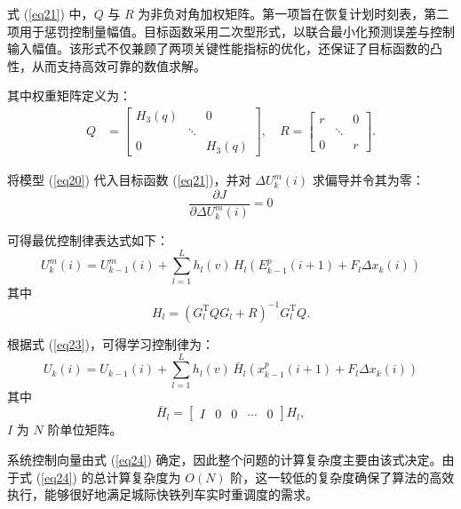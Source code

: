 式 (\ref{eq21}) 中，$Q$ 与 $R$ 为非负对角加权矩阵。第一项旨在恢复计划时刻表，第二项用于惩罚控制量幅值。目标函数采用二次型形式，以联合最小化预测误差与控制输入幅值。该形式不仅兼顾了两项关键性能指标的优化，还保证了目标函数的凸性，从而支持高效可靠的数值求解。

其中权重矩阵定义为：
\begin{equation*}
\begin{aligned}
Q &= 
\left[
\begin{array}{ccc}
H_{3}(q) &        & 0 \\
         & \ddots &   \\
0        &        & H_{3}(q)
\end{array}
\right],
\quad
R = 
\left[
\begin{array}{ccc}
r &        & 0 \\
  & \ddots &   \\
0 &        & r
\end{array}
\right].
\end{aligned}
\end{equation*}

将模型 (\ref{eq20}) 代入目标函数 (\ref{eq21})，并对 $\Delta U_k^m(i)$ 求偏导并令其为零：
\begin{equation}
\frac{\partial J}{\partial \Delta U_k^m(i)}=0
\label{eq22}
\end{equation}

可得最优控制律表达式如下：
\begin{equation}
U_k^m(i)=U_{k-1}^m(i)+\sum_{l=1}^{L} h_l(v)\, H_l \left( E_{k-1}^p(i+1) + F_l \Delta x_k(i) \right)
\label{eq23}
\end{equation}
其中
\begin{equation*}
	H_l=\left(G_l^{\mathrm{T}} Q G_l + R\right)^{-1} G_l^{\mathrm{T}} Q.
\end{equation*}

根据式 (\ref{eq23})，可得学习控制律为：
\begin{equation}
U_k(i)=U_{k-1}(i)+\sum_{l=1}^{L} h_l(v)\, \bar{H}_l \left( x_{k-1}^p(i+1) + F_l \Delta x_k(i) \right)
\label{eq24}
\end{equation}
其中
\begin{equation*}
	\bar{H}_l = \left[\begin{array}{lllll}
		I & 0 & 0 & \cdots & 0
	\end{array}\right] H_l,
\end{equation*}
$I$ 为 $N$ 阶单位矩阵。

系统控制向量由式 (\ref{eq24}) 确定，因此整个问题的计算复杂度主要由该式决定。由于式 (\ref{eq24}) 的总计算复杂度为 $O(N)$ 阶，这一较低的复杂度确保了算法的高效执行，能够很好地满足城际快铁列车实时重调度的需求。

